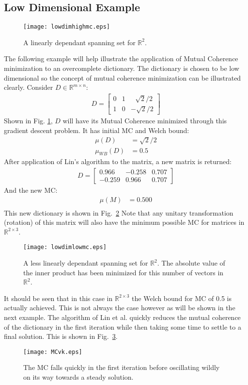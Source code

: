 \documentclass[journal]{IEEEtran}
\begin{document}
\subsection{Low Dimensional Example}
\begin{figure}[!h]
\centering
\texttt{[image: lowdimhighmc.eps]}
\caption{A linearly dependant spanning set for $\mathbb{R}^2$.}
\label{Fig:lowdimhigh}
\end{figure}
\noindent The following example will help illustrate the application of Mutual Coherence minimization
to an overcomplete dictionary. The dictionary is chosen to be low dimensional so the concept
of mutual coherence minimization can be illustrated clearly.
Consider $D \in \mathbb{R}^{m\times n}$:
\begin{align}
    D = \begin{bmatrix} 0 &1 &\>\>\>\sqrt{2}/2 \\
                        1 &0 &-\sqrt{2}/2 \end{bmatrix}
\end{align}
Shown in Fig. \ref{Fig:lowdimhigh}, $D$ will have its Mutual Coherence minimized through this gradient 
descent problem.
It has initial MC and Welch bound:
\begin{align}
\mu (D) &= \sqrt{2}/2 \\
\mu_{WB} (D) &= 0.5
\end{align}
After application of Lin's algorithm to the matrix, a new matrix is returned:
\begin{align}
    D = \left[\begin{array}{ccc} 0.966 & -0.258  &0.707\\ -0.259 & 0.966 & 0.707 \end{array}\right] 
\end{align}
And the new MC:
\begin{align}
\mu (M) &= 0.500 \\[1em]
\end{align}
This new dictionary is shown in Fig.~\ref{Fig:lowdimlow}
Note that any unitary transformation (rotation) of this matrix will also have the minimum possible MC for
matrices in $\mathbb{R}^{2 \times 3}$.
\begin{figure}[!t]
\centering
\texttt{[image: lowdimlowmc.eps]}
\caption{A less linearly dependant spanning set for $\mathbb{R}^2$. The absolute value
of the inner product has been minimized for this number of vectors in $\mathbb{R}^2$.}
\label{Fig:lowdimlow}
\end{figure}
It should be seen that in this case in $\mathbb{R}^{2\times3}$ the Welch bound for MC of 0.5 is 
actually achieved. This is not always the case however as will be shown in the next example.
The algorithm of Lin et al. quickly reduces the mutual coherence of the dictionary in the first iteration while then taking some time to settle to a final solution. This is shown in Fig.~\ref{Fig:mcvk}.
\begin{figure}[!t]
\centering
\texttt{[image: MCvk.eps]}
\caption{The MC falls quickly in the first iteration before oscillating wildly on its way towards a
steady solution.}
\label{Fig:mcvk}
\end{figure}
\end{document}
